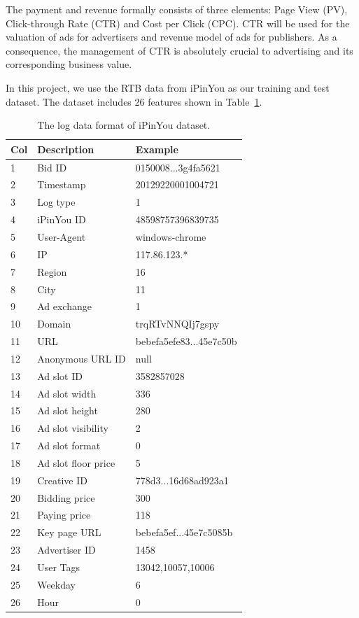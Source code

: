 The payment and revenue formally consists of three elements: Page View (PV), Click-through Rate (CTR) and Cost per Click (CPC). CTR will be used for the valuation of ads for advertisers and revenue model of ads for publishers. As a consequence, the management of CTR is absolutely crucial to advertising and its corresponding business value.

In this project, we use the RTB data from iPinYou as our training and test dataset. The dataset includes 26 features shown in Table~\ref{tab:features}.

\begin{table}[h]
\caption{The log data format of iPinYou dataset.}
\label{tab:features}
\begin{center}
\begin{tabular}{ l l l } 
\hline
Col & Description & Example \\
\hline
1 & Bid ID & 0150008...3g4fa5621 \\ 
2 & Timestamp & 20129220001004721 \\ 
3 & Log type & 1 \\ 
4 & iPinYou ID & 48598757396839735 \\
5 & User-Agent & windows-chrome \\
6 & IP & 117.86.123.* \\
7 & Region & 16 \\
8 & City & 11 \\
9 & Ad exchange & 1 \\
10 & Domain & trqRTvNNQIj7gspy \\
11 & URL & bebefa5efe83...45e7c50b \\
12 & Anonymous URL ID & null \\
13 & Ad slot ID & 3582857028 \\
14 & Ad slot width & 336 \\
15 & Ad slot height & 280 \\
16 & Ad slot visibility & 2 \\
17 & Ad slot format & 0 \\
18 & Ad slot floor price & 5 \\
19 & Creative ID & 778d3...16d68ad923a1 \\
20 & Bidding price & 300 \\
21 & Paying price & 118 \\
22 & Key page URL & bebefa5ef...45e7c5085b \\
23 & Advertiser ID & 1458 \\
24 & User Tags & 13042,10057,10006 \\
25 & Weekday & 6 \\
26 & Hour & 0 \\
\hline
\end{tabular}
\end{center}
\end {table}

